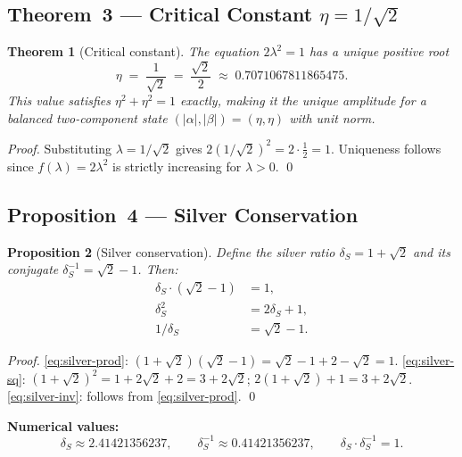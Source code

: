 \documentclass[12pt,a4paper]{article}
\theoremstyle{plain}
\newtheorem{theorem}{Theorem}[section]
\newtheorem{proposition}[theorem]{Proposition}
\theoremstyle{definition}
\theoremstyle{remark}
\newcommand{\abs}[1]{\lvert #1 \rvert}
\newcommand{\dS}{\delta_S}        %
\begin{document}
\subsection{Theorem~3 — Critical Constant \texorpdfstring{$\eta = 1/\sqrt{2}$}{eta}}

\begin{theorem}[Critical constant]\label{thm:3}
  The equation $2\lambda^2 = 1$ has a unique positive root
  \begin{equation}
    \eta \;=\; \frac{1}{\sqrt{2}} \;=\; \frac{\sqrt{2}}{2}
         \;\approx\; 0.7071067811865475.
    \label{eq:eta}
  \end{equation}
  This value satisfies $\eta^2 + \eta^2 = 1$ exactly, making it the unique
  amplitude for a balanced two-component state
  $(\abs{\alpha},\abs{\beta}) = (\eta,\eta)$ with unit norm.
\end{theorem}

\begin{proof}
  Substituting $\lambda = 1/\sqrt{2}$ gives $2(1/\sqrt{2})^2 = 2\cdot\tfrac{1}{2} = 1$.
  Uniqueness follows since $f(\lambda)=2\lambda^2$ is strictly increasing for
  $\lambda>0$. \qed
\end{proof}

\subsection{Proposition~4 — Silver Conservation}

\begin{proposition}[Silver conservation]\label{prop:4}
  Define the \emph{silver ratio} $\dS = 1+\sqrt{2}$ and its conjugate
  $\dS^{-1} = \sqrt{2}-1$.  Then:
  \begin{align}
    \dS \cdot (\sqrt{2}-1) &= 1,  \label{eq:silver-prod}\\
    \dS^2 &= 2\dS + 1,            \label{eq:silver-sq}\\
    1/\dS &= \sqrt{2}-1.          \label{eq:silver-inv}
  \end{align}
\end{proposition}

\begin{proof}
  \eqref{eq:silver-prod}: $(1+\sqrt{2})(\sqrt{2}-1) = \sqrt{2}-1+2-\sqrt{2} = 1$.
  \eqref{eq:silver-sq}: $(1+\sqrt{2})^2 = 1+2\sqrt{2}+2 = 3+2\sqrt{2}$;
  $2(1+\sqrt{2})+1 = 3+2\sqrt{2}$. \quad
  \eqref{eq:silver-inv}: follows from \eqref{eq:silver-prod}. \qed
\end{proof}

\noindent
\textbf{Numerical values:}
\[
  \dS \approx 2.41421356237,\qquad
  \dS^{-1} \approx 0.41421356237,\qquad
  \dS \cdot \dS^{-1} = 1.
\]
\end{document}
